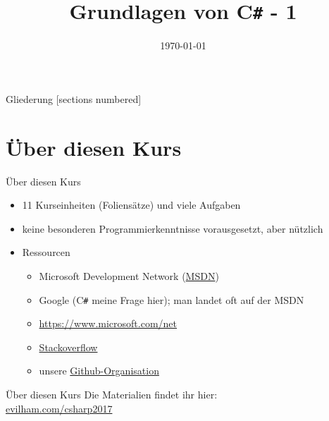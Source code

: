 



\title{Grundlagen von C\texttt{\#} - 1}
\date{\today}




\maketitle

\begin{frame}{Gliederung}
	[sections numbered]
	\tableofcontents
\end{frame}

\section{Über diesen Kurs}
\begin{frame}{Über diesen Kurs}
	\begin{itemize}
		\item 11 Kurseinheiten (Foliensätze) und viele Aufgaben
		\item keine besonderen Programmierkenntnisse vorausgesetzt, aber nützlich
		\item Ressourcen
		\begin{itemize}
			\item Microsoft Development Network (\href{https://msdn.microsoft.com}{\alert{MSDN}})
			\item Google (C\texttt{\#} meine Frage hier); man landet oft auf der MSDN
			\item \href{https://www.microsoft.com/net}{\alert{https://www.microsoft.com/net}}
			\item \href{http://stackoverflow.com/}{\alert{Stackoverflow}}
			\item unsere \href{https://github.com/fsr}{\alert{Github-Organisation}}
		\end{itemize}
	\end{itemize}
\end{frame}

\begin{frame}{Über diesen Kurs}
	\centering \normalsize Die Materialien findet ihr hier: \\
	\huge \alert{\href{https://evilham.com/csharp2017}{evilham.com/csharp2017}}\\	

\end{frame}

